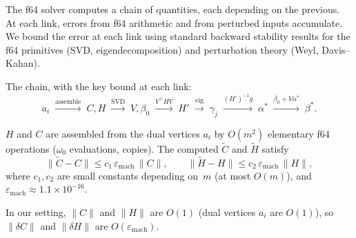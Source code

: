 \begin{remark}\label{rem:perturbation-chain}
The f64 solver computes a chain of quantities, each depending
on the previous.
At each link, errors from f64 arithmetic and from perturbed
inputs accumulate.
We bound the error at each link using standard backward
stability results for the f64 primitives (SVD, eigendecomposition)
and perturbation theory (Weyl, Davis--Kahan).

The chain, with the key bound at each link:
\[
  a_i
  \;\xrightarrow{\text{assemble}}\;
  C, H
  \;\xrightarrow{\text{SVD}}\;
  V, \beta_0
  \;\xrightarrow{V^\top H V}\;
  H'
  \;\xrightarrow{\text{eig}}\;
  \gamma_j
  \;\xrightarrow{(H')^{-1} g}\;
  \alpha^*
  \;\xrightarrow{\beta_0 + V\alpha^*}\;
  \beta^*.
\]
\end{remark}


\begin{lemma}\label{lem:link-assembly}
$H$ and $C$ are assembled from the dual vertices $a_i$ by
$O(m^2)$ elementary f64 operations
($\omega_0$ evaluations, copies).
The computed $\tilde C$ and $\tilde H$ satisfy
\[
  \|\tilde C - C\| \leq c_1\, \varepsilon_{\mathrm{mach}}\, \|C\|,
  \qquad
  \|\tilde H - H\| \leq c_2\, \varepsilon_{\mathrm{mach}}\, \|H\|,
\]
where $c_1, c_2$ are small constants depending on~$m$
(at most $O(m)$), and $\varepsilon_{\mathrm{mach}} \approx 1.1 \times 10^{-16}$.

In our setting, $\|C\|$ and $\|H\|$ are $O(1)$
(dual vertices $a_i$ are $O(1)$),
so $\|\delta C\|$ and $\|\delta H\|$ are $O(\varepsilon_{\mathrm{mach}})$.
\end{lemma}


